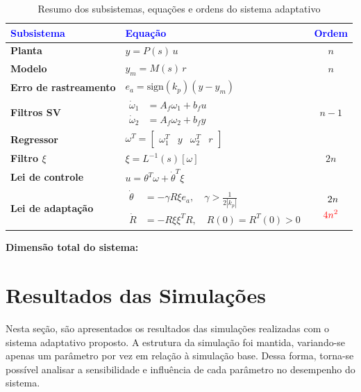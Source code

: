 \documentclass[10pt]{article}
\begin{document}
\begin{table}[htbp]
\centering
\begin{tabular}{|>{\bfseries}m{4cm}|m{6cm}|c|}
\hline
\textcolor{blue}{Subsistema} & \textcolor{blue}{Equação} & \textcolor{blue}{Ordem} \\
\hline
Planta & $y = P(s)\,u$ & $n$ \\
\hline
Modelo & $y_m = M(s)\,r$ & $n$ \\
\hline
Erro de rastreamento & $e_a = \text{sign}(k_p)(y - y_m)$ & \\
\hline
Filtros SV & 
$\begin{aligned}
\dot{\omega}_1 &= A_f \omega_1 + b_f u \\
\dot{\omega}_2 &= A_f \omega_2 + b_f y
\end{aligned}$ & $n-1$ \\
\hline
Regressor & $\omega^T = \begin{bmatrix} \omega_1^T & y & \omega_2^T & r \end{bmatrix}$ & \\
\hline
Filtro $\xi$ & $\xi = L^{-1}(s)[\omega]$ & $2n$ \\
\hline
Lei de controle & $u = \theta^T \omega + \dot{\theta}^T \xi$ & \\
\hline
Lei de adaptação & 
$\begin{aligned}
\dot{\theta} &= -\gamma R \xi e_a, \quad \gamma > \frac{1}{2|k_p|} \\
\dot{R} &= -R \xi \xi^T R, \quad R(0) = R^T(0) > 0
\end{aligned}$ & 
$\begin{aligned}
2n \\
\textcolor{red}{4n^2}
\end{aligned}$ \\
\hline
\end{tabular}
\caption{Resumo dos subsistemas, equações e ordens do sistema adaptativo}
\vspace{1em}
\textbf{Dimensão total do sistema:} \quad
{}
\end{table}

\newpage

\section{Resultados das Simulações}

Nesta seção, são apresentados os resultados das simulações realizadas com o sistema adaptativo proposto. A estrutura da simulação foi mantida, variando-se apenas um parâmetro por vez em relação à simulação base. Dessa forma, torna-se possível analisar a sensibilidade e influência de cada parâmetro no desempenho do sistema.
\end{document}
